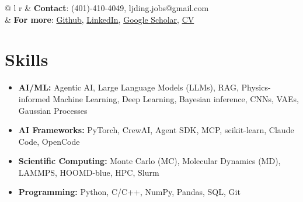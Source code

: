 \documentclass[11pt,letterpaper]{article}
\begin{document}
\pagestyle{empty}
\noindent\begin{tabular*}{\textwidth}{@{\extracolsep{\fill}} l r}
 & \textbf{Contact}: (401)-410-4049, ljding.jobs@gmail.com\\
 & \textbf{For more}: \href{https://github.com/ljding94}{Github}, \href{https://www.linkedin.com/in/lijie-ding-305b04171/}{LinkedIn}, \href{https://scholar.google.com/citations?user=i-U0wBsAAAAJ&hl=en&oi=ao}{Google Scholar}, \href{https://ljding94.github.io/file/cv_resume/cv_lding.pdf}{CV}\\
\end{tabular*}


\section*{Skills}
\begin{itemize}[leftmargin=*]
    \item \textbf{AI/ML:} Agentic AI, Large Language Models (LLMs), RAG, Physics-informed Machine Learning, Deep Learning, Bayesian inference, CNNs, VAEs, Gaussian Processes
    \item \textbf{AI Frameworks:} PyTorch, CrewAI, Agent SDK, MCP, scikit-learn, Claude Code, OpenCode
    \item \textbf{Scientific Computing:} Monte Carlo (MC), Molecular Dynamics (MD), LAMMPS, HOOMD-blue, HPC, Slurm
    \item \textbf{Programming:} Python, C/C++, NumPy, Pandas, SQL, Git
\end{itemize}

\end{document}
